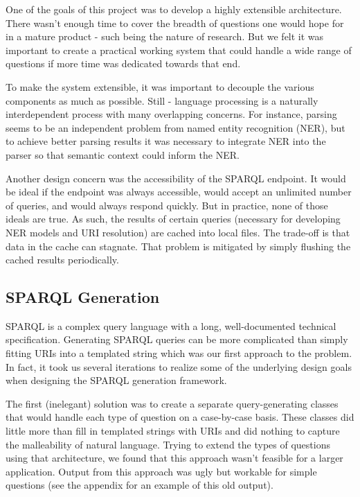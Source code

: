 \documentclass[11pt]{article}
\begin{document}
One of the goals of this project was to develop a
highly extensible architecture. There wasn't enough time to cover the
breadth of questions one would hope for in a mature product - such being
the nature of research. But we felt it was important to create a practical
working system that could handle a wide range of questions if more
time was dedicated towards that end.

To make the system extensible, it was important to decouple the various
components as much as possible. Still - language processing is a naturally
interdependent process with many overlapping concerns. For instance,
parsing seems to be an independent problem from named entity recognition (NER),
but to achieve better parsing results it was necessary to integrate NER into the
parser so that semantic context could inform the NER. 

Another design concern was the accessibility of the SPARQL endpoint.
It would be ideal if the endpoint was always accessible, would accept an unlimited
number of queries, and would always respond quickly. But in practice, none of
those ideals are true. As such, the results of certain queries
(necessary for developing NER models and URI resolution) are cached into local files.
The trade-off is that data in the cache can stagnate. That problem is mitigated by 
simply flushing the cached results periodically.

\subsection{SPARQL Generation}
\label{section:sparql_gen}
SPARQL is a complex query language with a long, well-documented 
technical specification\cite{sparql, sparql11}. Generating SPARQL queries can be
more complicated than simply fitting URIs into a templated string which was our
first approach to the problem. In fact, it took us several iterations to realize
some of the underlying design goals when designing the SPARQL generation framework.

The first (inelegant) solution was to create a separate query-generating
classes that would handle each type of question on a case-by-case basis.
These classes did little more than fill in templated strings with URIs and did
nothing to capture the malleability of natural language.
Trying to extend the types of questions using that architecture, we found that
this approach wasn't feasible for a larger application.
Output from this approach was ugly but workable for simple questions (see the
appendix for an example of this old output).
\end{document}
